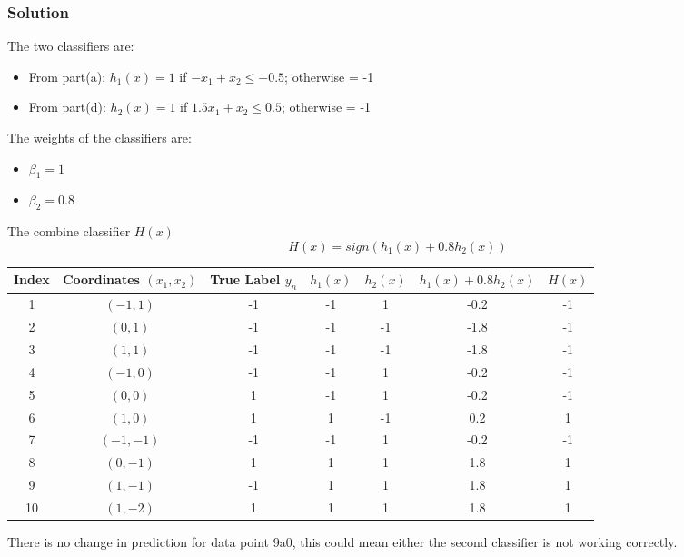 \documentclass{article}
\begin{document}
\begin{enumerate}[label=\alph*)]
   \subsubsection*{Solution}
   The two classifiers are:
   \begin{itemize}
      \item From part(a): \(h_1(x) = 1\) if \(-x_1 + x_2 \leq -0.5\); otherwise = -1
      \item From part(d): \(h_2(x) = 1\) if \(1.5x_1 + x_2 \leq 0.5\); otherwise = -1
   \end{itemize}
   The weights of the classifiers are:
   \begin{itemize}
      \item \(\beta_1 = 1\)
      \item \(\beta_2 = 0.8\)
   \end{itemize}
   The combine classifier \(H(x)\)
   \[
    H(x) = sign(h_1(x) + 0.8h_2(x))
   \]
   \begin{table}[h!]
      \centering
      \begin{tabular}{|c|c|c|c|c|c|c|}
      \hline
      Index & Coordinates $(x_1, x_2)$ & True Label $y_n$ & $h_1(x)$ & $h_2(x)$ & $h_1(x) + 0.8h_2(x)$ & $H(x)$ \\ 
      \hline
      1 & $(-1, 1)$ & -1 & -1 & 1 & -0.2 & -1 \\ 
      \hline
      2 & $(0, 1)$ & -1 & -1 & -1 & -1.8 & -1 \\ 
      \hline
      3 & $(1, 1)$ & -1 & -1 & -1 & -1.8 & -1 \\ 
      \hline
      4 & $(-1, 0)$ & -1 & -1 & 1 & -0.2 & -1 \\ 
      \hline
      5 & $(0, 0)$ & 1 & -1 & 1 & -0.2 & -1 \\ 
      \hline
      6 & $(1, 0)$ & 1 & 1 & -1 & 0.2 & 1 \\ 
      \hline
      7 & $(-1, -1)$ & -1 & -1 & 1 & -0.2 & -1 \\ 
      \hline
      8 & $(0, -1)$ & 1 & 1 & 1 & 1.8 & 1 \\ 
      \hline
      9 & $(1, -1)$ & -1 & 1 & 1 & 1.8 & 1 \\ 
      \hline
      10 & $(1, -2)$ & 1 & 1 & 1 & 1.8 & 1 \\ 
      \hline
      \end{tabular}
   \end{table}  
   There is no change in prediction for data point 9a0, this could mean either the second classifier is not working correctly.


\end{enumerate}
\end{document}

